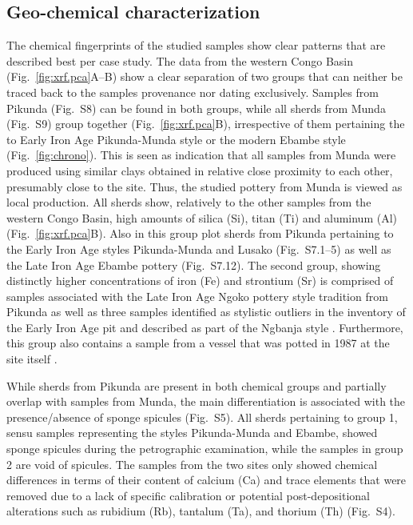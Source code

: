 \documentclass[preprint,10pt,oneside,onecolumn,authoryear]{elsarticle}
\begin{document}
\subsection{Geo-chemical characterization}

The chemical fingerprints of the studied samples show clear patterns that are described best per case study. The data from the western Congo Basin (Fig.~\ref{fig:xrf.pca}A--B) show a clear separation of two groups that can neither be traced back to the samples provenance nor dating exclusively. Samples from Pikunda (Fig.~S8) can be found in both groups, while all sherds from Munda (Fig.~S9) group together (Fig.~\ref{fig:xrf.pca}B), irrespective of them pertaining the to Early Iron Age Pikunda-Munda style or the modern Ebambe style (Fig.~\ref{fig:chrono}). This is seen as indication that all samples from Munda were produced using similar clays obtained in relative close proximity to each other, presumably close to the site. Thus, the studied pottery from Munda is viewed as local production. All sherds show, relatively to the other samples from the western Congo Basin, high amounts of silica (Si), titan (Ti) and aluminum (Al) (Fig.~\ref{fig:xrf.pca}B). Also in this group plot sherds from Pikunda pertaining to the Early Iron Age styles Pikunda-Munda and Lusako (Fig.~S7.1--5) as well as the Late Iron Age Ebambe pottery (Fig.~S7.12). The second group, showing distinctly higher concentrations of iron (Fe) and strontium (Sr) is comprised of samples associated with the Late Iron Age Ngoko pottery style tradition from Pikunda \citep[Fig.~S7.11--12;][]{Seidensticker.2021e,Seidensticker.2024} as well as three samples identified as stylistic outliers in the inventory of the Early Iron Age pit and described as part of the Ngbanja style \citep[Fig.~S7.6--8;][295--297]{Seidensticker.2021e}. Furthermore, this group also contains a sample from a vessel that was potted in 1987 at the site itself \citep[cf.][Fig.~15]{Seidensticker.2025}.

While sherds from Pikunda are present in both chemical groups and partially overlap with samples from Munda, the main differentiation is associated with the presence/absence of sponge spicules (Fig.~S5). All sherds pertaining to group 1, sensu samples representing the styles Pikunda-Munda and Ebambe, showed sponge spicules during the petrographic examination, while the samples in group 2 are void of spicules. The samples from the two sites only showed chemical differences in terms of their content of calcium (Ca) and trace elements that were removed due to a lack of specific calibration or potential post-depositional alterations such as rubidium (Rb), tantalum (Ta), and thorium (Th) (Fig.~S4). 
\end{document}
